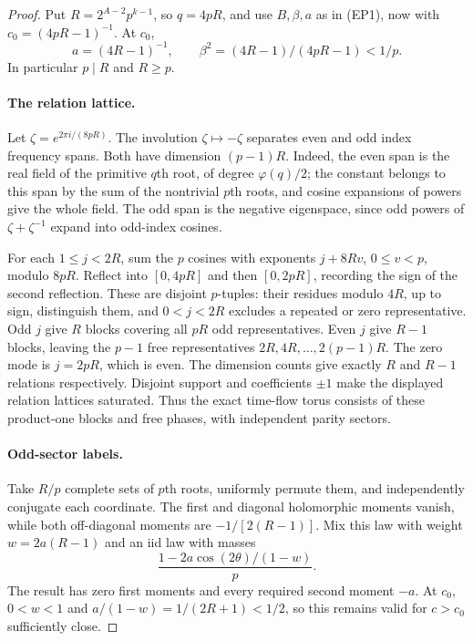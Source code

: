 \documentclass[11pt,a4paper]{article}
\theoremstyle{definition}\newtheorem{definition}[theorem]{Definition}
\theoremstyle{remark}\newtheorem{remark}[theorem]{Remark}
\begin{document}
\begin{proof}
Put $R=2^{A-2}p^{k-1}$, so $q=4pR$, and use $B,\beta,a$ as in
(EP1), now with $c_0=(4pR-1)^{-1}$. At $c_0$,
\[
 a=(4R-1)^{-1},\qquad \beta^2=(4R-1)/(4pR-1)<1/p.
\]
In particular $p\mid R$ and $R\ge p$.

\paragraph{The relation lattice.}
Let $\zeta=e^{2\pi i/(8pR)}$. The involution
$\zeta\mapsto-\zeta$ separates even and odd index frequency spans.
Both have dimension $(p-1)R$. Indeed, the even span is the real
field of the primitive $q$th root, of degree $\varphi(q)/2$;
the constant belongs to this span by the sum of the nontrivial
$p$th roots, and cosine expansions of powers give the whole field.
The odd span is the negative eigenspace, since odd powers of
$\zeta+\zeta^{-1}$ expand into odd-index cosines.

For each $1\le j<2R$, sum the $p$ cosines with exponents
$j+8Rv$, $0\le v<p$, modulo $8pR$. Reflect into $[0,4pR]$
and then $[0,2pR]$, recording the sign of the second reflection.
These are disjoint $p$-tuples: their residues modulo $4R$, up to
sign, distinguish them, and $0<j<2R$ excludes a repeated or zero
representative. Odd $j$ give $R$ blocks covering all $pR$ odd
representatives. Even $j$ give $R-1$ blocks, leaving the $p-1$
free representatives $2R,4R,\ldots,2(p-1)R$. The zero mode is
$j=2pR$, which is even. The dimension counts give exactly $R$
and $R-1$ relations respectively. Disjoint support and coefficients
$\pm1$ make the displayed relation lattices saturated. Thus the
exact time-flow torus consists of these product-one blocks and
free phases, with independent parity sectors.

\paragraph{Odd-sector labels.}
Take $R/p$ complete sets of $p$th roots, uniformly permute them,
and independently conjugate each coordinate. The first and diagonal
holomorphic moments vanish, while both off-diagonal moments are
$-1/[2(R-1)]$. Mix this law with weight $w=2a(R-1)$ and an iid
law with masses
\[
 \frac{1-2a\cos(2\theta)/(1-w)}p.
\]
The result has zero first moments and every required second moment
$-a$. At $c_0$, $0<w<1$ and $a/(1-w)=1/(2R+1)<1/2$,
so this remains valid for $c>c_0$ sufficiently close.


\end{proof}
\end{document}
